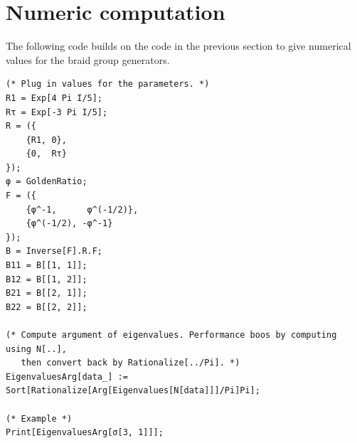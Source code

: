 \documentclass[a4paper,10pt,oneside]{book}
\theoremstyle{plain}
\theoremstyle{definition}
\theoremstyle{remark}
\begin{document}
\section{Numeric computation}

The following code builds on the code in the previous section to give numerical values for the braid group generators.

\begin{verbatim}
(* Plug in values for the parameters. *)
R1 = Exp[4 Pi I/5];
Rτ = Exp[-3 Pi I/5];
R = ({
    {R1, 0},
    {0,  Rτ}
});
φ = GoldenRatio;
F = ({
    {φ^-1,      φ^(-1/2)},
    {φ^(-1/2), -φ^-1}
});
B = Inverse[F].R.F;
B11 = B[[1, 1]];
B12 = B[[1, 2]];
B21 = B[[2, 1]];
B22 = B[[2, 2]];

(* Compute argument of eigenvalues. Performance boos by computing using N[..],
   then convert back by Rationalize[../Pi]. *)
EigenvaluesArg[data_] := Sort[Rationalize[Arg[Eigenvalues[N[data]]]/Pi]Pi];

(* Example *)
Print[EigenvaluesArg[σ[3, 1]]];
\end{verbatim}





\backmatter
\end{document}
